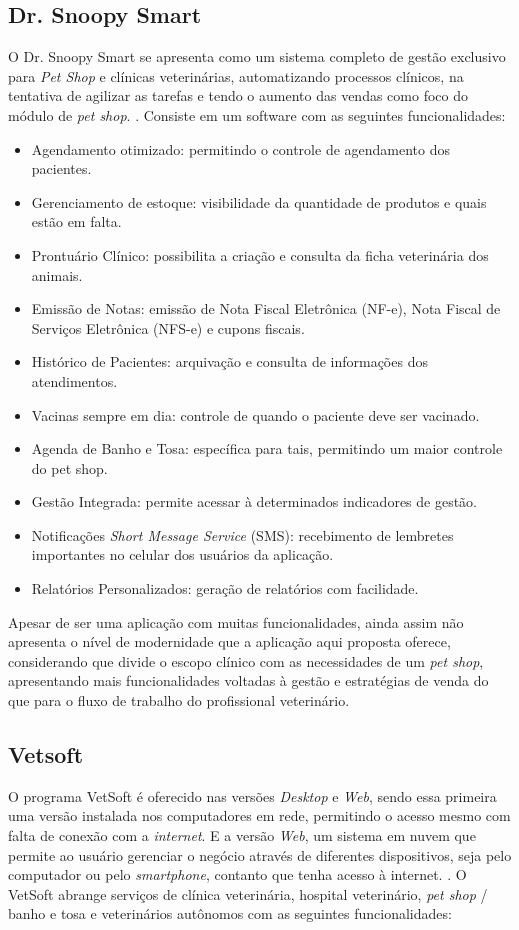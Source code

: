 \documentclass[
    12pt,               %
    openright,          %
    oneside,
    a4paper,            %
    BIBLATEX,           %
    TODO,               %
    english,            %
    brazil              %
    ]{ifsp-spo-inf-ctds}
\begin{document}
        \subsection{Dr. Snoopy Smart}
        O Dr. Snoopy Smart se apresenta como um sistema completo de gestão exclusivo para \emph{Pet Shop} e clínicas veterinárias, automatizando processos clínicos, na tentativa de agilizar as tarefas e tendo o aumento das vendas como foco do módulo de \emph{pet shop}. . Consiste em um software com as seguintes funcionalidades:

\begin{itemize}
    \item Agendamento otimizado: permitindo o controle de agendamento dos pacientes.
    \item Gerenciamento de estoque: visibilidade da quantidade de produtos e quais estão em falta.
    \item Prontuário Clínico: possibilita a criação e consulta da ficha veterinária dos animais.
    \item Emissão de Notas: emissão de Nota Fiscal Eletrônica (NF-e), Nota Fiscal de Serviços Eletrônica (NFS-e) e cupons fiscais.
    \item Histórico de Pacientes: arquivação e consulta de informações dos atendimentos. 
    \item Vacinas sempre em dia: controle de quando o paciente deve ser vacinado.
    \item Agenda de Banho e Tosa: específica para tais, permitindo um maior controle do pet shop.
    \item Gestão Integrada: permite acessar à determinados indicadores de gestão.
    \item Notificações \emph{Short Message Service} (SMS): recebimento de lembretes importantes no celular dos usuários da aplicação.
    \item Relatórios Personalizados: geração de relatórios com facilidade.
\end{itemize}

    Apesar de ser uma aplicação com muitas funcionalidades, ainda assim não apresenta o nível de modernidade que a aplicação aqui proposta oferece, considerando que divide o escopo clínico com as necessidades de um \emph{pet shop}, apresentando mais funcionalidades voltadas à gestão e estratégias de venda do que para o fluxo de trabalho do profissional veterinário.

        \subsection{Vetsoft}
        O programa VetSoft é oferecido nas versões \emph{Desktop} e \emph{Web}, sendo essa primeira uma versão instalada nos computadores em rede, permitindo o acesso mesmo com falta de conexão com a \emph{internet}. E a versão \emph{Web}, um sistema em nuvem que permite ao usuário gerenciar o negócio através de diferentes dispositivos, seja pelo computador ou pelo \emph{smartphone}, contanto que tenha acesso à internet. . O VetSoft abrange serviços de clínica veterinária, hospital veterinário, \emph{pet shop} / banho e tosa e veterinários autônomos com as seguintes funcionalidades:
\end{document}
